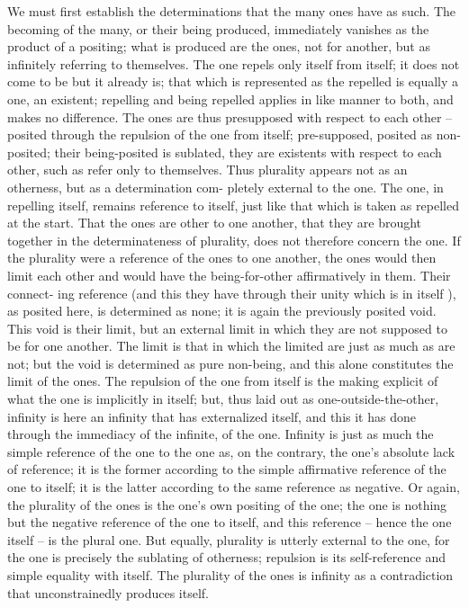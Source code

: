 We must first establish the determinations that the many ones have as
such. The becoming of the many, or their being produced, immediately
vanishes as the product of a positing; what is produced are the ones, not
for another, but as infinitely referring to themselves. The one repels only
itself from itself; it does not come to be but it already is; that which is
represented as the repelled is equally a one, an existent; repelling and being
repelled applies in like manner to both, and makes no difference.
The ones are thus presupposed with respect to each other – posited through
the repulsion of the one from itself; pre-supposed, posited as non-posited;
their being-posited is sublated, they are existents with respect to each other,
such as refer only to themselves.
Thus plurality appears not as an otherness, but as a determination com-
pletely external to the one. The one, in repelling itself, remains reference to
itself, just like that which is taken as repelled at the start. That the ones are
other to one another, that they are brought together in the determinateness
of plurality, does not therefore concern the one. If the plurality were a
reference of the ones to one another, the ones would then limit each other
and would have the being-for-other affirmatively in them. Their connect-
ing reference (and this they have through their unity which is in itself ),
as posited here, is determined as none; it is again the previously posited
void. This void is their limit, but an external limit in which they are not
supposed to be for one another. The limit is that in which the limited are
just as much as are not; but the void is determined as pure non-being, and
this alone constitutes the limit of the ones.
The repulsion of the one from itself is the making explicit of what the
one is implicitly in itself; but, thus laid out as one-outside-the-other, infinity
is here an infinity that has externalized itself, and this it has done through
the immediacy of the infinite, of the one. Infinity is just as much the simple
reference of the one to the one as, on the contrary, the one’s absolute lack
of reference; it is the former according to the simple affirmative reference
of the one to itself; it is the latter according to the same reference as
negative. Or again, the plurality of the ones is the one’s own positing of
the one; the one is nothing but the negative reference of the one to itself,
and this reference – hence the one itself – is the plural one. But equally,
plurality is utterly external to the one, for the one is precisely the sublating
of otherness; repulsion is its self-reference and simple equality with itself.
The plurality of the ones is infinity as a contradiction that unconstrainedly
produces itself.

